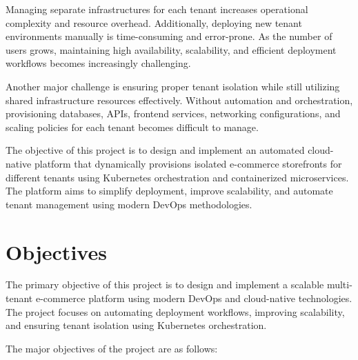 \documentclass[12pt,a4paper]{report}
\begin{document}
Managing separate infrastructures for each tenant increases operational complexity and resource overhead. Additionally, deploying new tenant environments manually is time-consuming and error-prone. As the number of users grows, maintaining high availability, scalability, and efficient deployment workflows becomes increasingly challenging.

Another major challenge is ensuring proper tenant isolation while still utilizing shared infrastructure resources effectively. Without automation and orchestration, provisioning databases, APIs, frontend services, networking configurations, and scaling policies for each tenant becomes difficult to manage.

The objective of this project is to design and implement an automated cloud-native platform that dynamically provisions isolated e-commerce storefronts for different tenants using Kubernetes orchestration and containerized microservices. The platform aims to simplify deployment, improve scalability, and automate tenant management using modern DevOps methodologies.

\newpage







\chapter{Objectives}

The primary objective of this project is to design and implement a scalable multi-tenant e-commerce platform using modern DevOps and cloud-native technologies. The project focuses on automating deployment workflows, improving scalability, and ensuring tenant isolation using Kubernetes orchestration.

The major objectives of the project are as follows:
\end{document}

